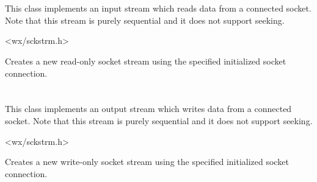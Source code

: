 
\section{}\label{wxsocketinputstream}

This class implements an input stream which reads data from
a connected socket. Note that this stream is purely sequential
and it does not support seeking.




<wx/sckstrm.h>






Creates a new read-only socket stream using the specified initialized
socket connection. 

\section{}\label{wxsocketoutputstream}

This class implements an output stream which writes data from
a connected socket. Note that this stream is purely sequential
and it does not support seeking.




<wx/sckstrm.h>






Creates a new write-only socket stream using the specified initialized
socket connection.

